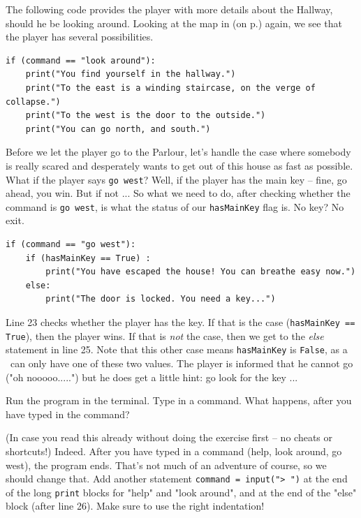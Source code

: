 The following code provides the player with more details about the Hallway, should he be looking around. Looking at the map in  (on p.\pageref{fig:hauntedhousemap}) again, we see that the player has several possibilities. 

\begin{lstlisting}[firstnumber=last]
 if (command == "look around"):
    print("You find yourself in the hallway.")
    print("To the east is a winding staircase, on the verge of collapse.")
    print("To the west is the door to the outside.")
    print("You can go north, and south.")
\end{lstlisting}

Before we let the player go to the Parlour, let's handle the case where somebody is really scared and desperately wants to get out of this house as fast as possible. What if the player says \texttt{go west}? Well, if the player has the main key -- fine, go ahead, you win. But if not ... So what we need to do, after checking whether the command is \texttt{go west}, is what the status of our \texttt{hasMainKey} flag is. No key? No exit. 

\begin{lstlisting}[firstnumber=last]
if (command == "go west"):
    if (hasMainKey == True) :
        print("You have escaped the house! You can breathe easy now.")
    else:
        print("The door is locked. You need a key...")
\end{lstlisting}

Line 23 checks whether the player has the key. If that is the case (\texttt{hasMainKey == True}), then the player wins. If that is \emph{not} the case, then we get to the \emph{else} statement in line 25. Note that this other case means \texttt{hasMainKey} is \texttt{False}, as a \boolean\ can only have one of these two values. The player is informed that he cannot go ("oh nooooo.....") but he does get a little hint: go look for the key ... 

\begin{Exe}
Run the program in the terminal. Type in a command. What happens, after you have typed in the command? \expend
\end{Exe}

(In case you read this already without doing the exercise first -- no cheats or shortcuts!) Indeed. After you have typed in a command (help, look around, go west), the program ends. That's not much of an adventure of course, so we should change that. Add another statement \texttt{command = input("> ")} at the end of the long \texttt{print} blocks for "help" and "look around", and at the end of the "else" block (after line 26). Make sure to use the right indentation!  
      
